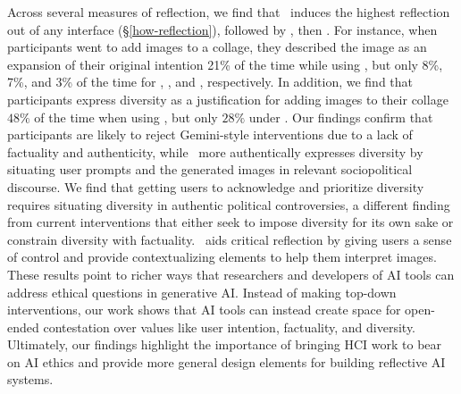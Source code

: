 Across several measures of reflection, we find that \agonistic~induces the highest reflection out of any interface (\S\ref{how-reflection}), followed by , then \diverse.
For instance, when participants went to add images to a collage, they described the image as an expansion of their original intention 21\% of the time while using \agonistic, but only 8\%, 7\%, and 3\% of the time for , \diverse, and \baseline, respectively.
In addition, we find that participants express diversity as a justification for adding images to their collage
 $48\%$ of the time when using \agonistic, but only $28\%$ under \diverse.
Our findings confirm that participants are likely to reject Gemini-style interventions due to a lack of factuality and authenticity, while \agonistic~more authentically expresses diversity by situating user prompts and the generated images in relevant sociopolitical discourse.
We find that getting users to acknowledge and prioritize diversity requires situating diversity in authentic political controversies, a different finding from current interventions that either seek to impose diversity for its own sake or constrain diversity with factuality.
\agonistic~aids critical reflection by giving users a sense of control and provide contextualizing elements to help them interpret images.
These results point to richer ways that researchers and developers of AI tools can address ethical questions in generative AI. 
Instead of making top-down interventions, our work shows that AI tools can instead create space for open-ended contestation over values like user intention, factuality, and diversity. 
Ultimately, our findings highlight the importance of bringing HCI work to bear on AI ethics and provide more general design elements for building reflective AI systems.



